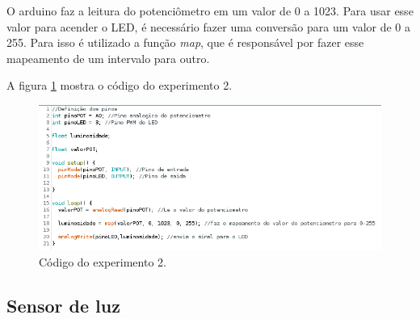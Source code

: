 \documentclass[12pt]{article}
\begin{document}
	O arduino faz a leitura do potenciômetro em um valor de 0 a 1023. Para usar esse valor para acender o LED, é necessário fazer uma conversão para um valor de 0 a 255. Para isso é utilizado a função \textit{map}, que é responsável por fazer esse mapeamento de um intervalo para outro.

	A figura \ref{figExp2BrilhoLEDcod} mostra o código do experimento 2.\\

	\begin{figure}[h!]
		\centering
		\includegraphics[scale=0.6]{Imagens/Experimentos/2-brilhoLED/2-brilhoLEDcod.png}
		\caption{Código do experimento 2.}
		\label{figExp2BrilhoLEDcod}
	\end{figure}

\subsection{Sensor de luz}



\end{document}
